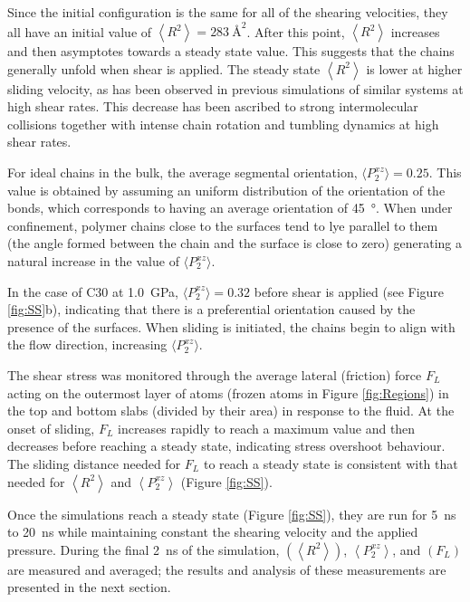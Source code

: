 \documentclass[aps,prb,reprint,superscriptaddress, a4paper]{revtex4-1}
\begin{document}
Since the initial configuration is the same for all of the shearing velocities, they all have an initial value of $\left< R^2 \right> = \SI{283}{\angstrom\squared}$. After this point, $\left< R^2 \right> $ increases and then asymptotes towards a steady state value. This suggests that the chains generally unfold when shear is applied. The steady state $\left< R^2 \right>$ is lower at higher sliding velocity, as has been observed in previous simulations of similar systems at high shear rates\cite{Cho2017}. This decrease has been ascribed to strong intermolecular collisions together with intense chain rotation and tumbling dynamics at high shear rates.

For ideal chains in the bulk, the average segmental orientation, $\langle P_{2}^{xz}\rangle=0.25$. This value is obtained by assuming an uniform distribution of the orientation of the bonds, which corresponds to having an average orientation of \SI{45}{\degree}. When under confinement, polymer chains close to the surfaces tend to lye parallel to them (the angle formed between the chain and the surface is close to zero) generating a natural increase in the value of  $\langle P_{2}^{xz}\rangle$.

In the case of C30 at \SI{1.0}{\giga\pascal}, $\langle P_{2}^{xz}\rangle=0.32$ before shear is applied (see Figure \ref{fig:SS}b), indicating that there is a preferential orientation caused by the presence of the surfaces. When sliding is initiated, the chains begin to align with the flow direction, increasing $\langle P_{2}^{xz}\rangle$.


The shear stress was monitored through the average lateral (friction) force $F_L$ acting on the outermost layer of atoms (frozen atoms in Figure \ref{fig:Regions}) in the top and bottom slabs (divided by their area) in response to the fluid. At the onset of sliding, $F_L$ increases rapidly to reach a maximum value and then decreases before reaching a steady state, indicating stress overshoot behaviour\cite{Jeong2017}. The sliding distance needed for $F_L$ to reach a steady state is consistent with that needed for $\left< R^2 \right> $ and $\left<P_{2}^{xz} \right> $ (Figure \ref{fig:SS}).

Once the simulations reach a steady state (Figure \ref{fig:SS}), they are run for \SI{5}{\nano\second} to \SI{20}{\nano\second} while maintaining constant the shearing velocity and the applied pressure. During the final \SI{2}{\nano\second} of the simulation, $\left(\left< R^2 \right> \right)$, $\left<P_{2}^{xz} \right> $, and $\left(F_L\right)$ are measured and averaged; the results and analysis of these measurements are presented in the next section.
\end{document}
